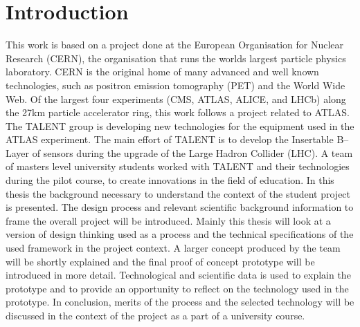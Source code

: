 \documentclass[english,12pt,a4paper,pdftex]{article}
\begin{document}
\cleardoublepage
\storeinipagenumber
{}
\setcounter{page}{1}


\section{Introduction}

\thispagestyle{empty}

This work is based on a project done at the European Organisation for Nuclear Research (CERN), the organisation that runs the worlds largest particle physics laboratory. CERN is the original home of many advanced and well known technologies, such as positron emission tomography (PET) and the World Wide Web. Of the largest four experiments (CMS, ATLAS, ALICE, and LHCb) along the 27km particle accelerator ring, this work follows a project related to ATLAS.
The TALENT group is developing new technologies for the equipment used in the ATLAS experiment. The main effort of TALENT is to develop the Insertable B--Layer of sensors during the upgrade of the Large Hadron Collider (LHC). A team of masters level university students worked with TALENT and their technologies during the pilot course, to create innovations in the field of education.
In this thesis the background necessary to understand the context of the student project is presented. The design process and relevant scientific background information to frame the overall project will be introduced. Mainly this thesis will look at a version of design thinking used as a process and the technical specifications of the used framework in the project context. A larger concept produced by the team will be shortly explained and the final proof of concept prototype will be introduced in more detail. Technological and scientific data is used to explain the prototype and to provide an opportunity to reflect on the technology used in the prototype. In conclusion, merits of the process and the selected technology will be discussed in the context of the project as a part of a university course.
\end{document}
